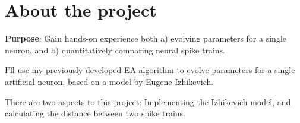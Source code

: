 \section{About the project}


\textbf{Purpose}: Gain hands-on experience both a) evolving parameters 
for a single neuron, and b) quantitatively comparing neural spike trains.

I'll use my previously developed EA algorithm to evolve parameters for a
single artificial neuron, based on a model by Eugene Izhikevich. 

There are two aspects to this project: Implementing the Izhikevich model,
and calculating the distance between two spike trains. 

